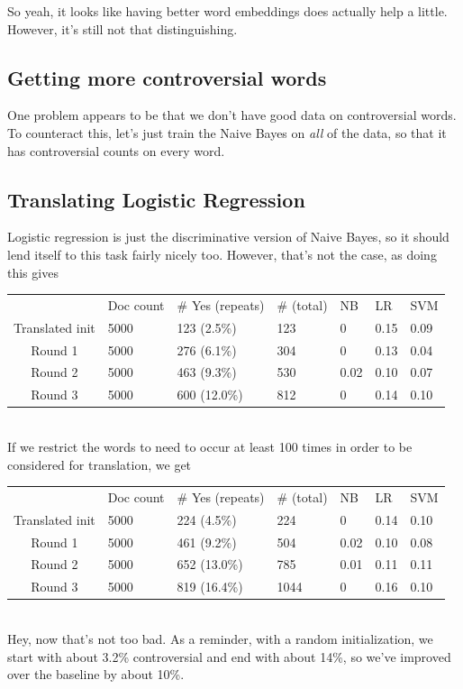 \documentclass[11pt]{article} %
\begin{document}
So yeah, it looks like having better word embeddings does actually help a little. However, it's still not that distinguishing.

\subsection{Getting more controversial words}

One problem appears to be that we don't have good data on controversial words. To counteract this, let's just train the Naive Bayes on \emph{all} of the data, so that it has controversial counts on every word. 


\subsection{Translating Logistic Regression}

Logistic regression is just the discriminative version of Naive Bayes, so it should lend itself to this task fairly nicely too. However, that's not the case, as doing this gives \\

\begin{tabular}{|c|*{6}{l|}}
\rowcolor{gray!50} & Doc count & \# Yes (repeats) & \# (total) & NB & LR & SVM \\
Translated init & 5000 & 123 (2.5\%) & 123 & 0 &  0.15 & 0.09 \\
Round 1 & 5000 &  276 (6.1\%) & 304 &  0 & 0.13 & 0.04 \\
Round 2 & 5000 & 463 (9.3\%)& 530 & 0.02 & 0.10 & 0.07 \\
Round 3 & 5000 & 600 (12.0\%) & 812 & 0 & 0.14 & 0.10 \\
\end{tabular} \\
If we restrict the words to need to occur at least 100 times in order to be considered for translation, we get

\begin{tabular}{|c|*{6}{l|}}
\rowcolor{gray!50} & Doc count & \# Yes (repeats) & \# (total) & NB & LR & SVM \\
Translated init & 5000 & 224 (4.5\%) & 224 & 0 & 0.14 & 0.10 \\
Round 1 & 5000 &  461 (9.2\%) & 504 & 0.02 & 0.10 & 0.08 \\
Round 2 & 5000 &  652 (13.0\%) & 785 & 0.01 & 0.11 & 0.11 \\
Round 3 & 5000 &  819 (16.4\%) & 1044 & 0 & 0.16 & 0.10 \\
\end{tabular} \\
Hey, now that's not too bad. As a reminder, with a random initialization, we start with about 3.2\% controversial and end with about 14\%, so we've improved over the baseline by about 10\%. 
\end{document}
